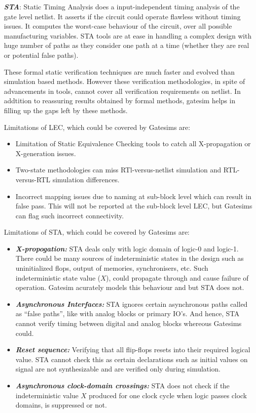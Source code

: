 \emph {\bf STA}: Static Timing Analysis does a input-independent timing analysis of the gate level netlist. It asserts if the circuit could operate flawless without timing issues. It computes the worst-case behaviour of the circuit, over all possible manufacturing variables. STA tools are at ease in handling a complex design with huge number of paths as they consider one path at a time (whether they are real or potential false paths). 



These formal static verification techniques are much faster and evolved than simulation based methods. However these verification methodologies, in spite of advancements in tools, cannot cover all verification requirements on netlist. In addtition to reassuring results obtained by formal methods, gatesim helps in filling up the gaps left by these methods. 

Limitations of LEC, which could be covered by Gatesims are:
\begin{itemize}
	\item Limitation of Static Equivalence Checking tools to catch all X-propagation or X-generation issues.
	\item Two-state methodologies can miss RTl-versus-netlist simulation and RTL-versus-RTL simulation differences.
	\item Incorrect mapping issues due to naming at sub-block level which can result in false pass. This will not be reported at the sub-block level LEC, but Gatesims can flag such incorrect connectivity.
\end{itemize}

Limitations of STA, which could be covered by Gatesims are:
\begin{itemize}
	\item \emph{\bf X-propogation:} STA deals only with logic domain of logic-0 and logic-1. There could be many sources of indeterministic states in the design such as uninitialized flops, output of memories, synchronisers, etc. Such indeterministic state value ($X$), could propagate through and cause failure of operation. Gatesim acurately models this behaviour and but STA does not.
	\item \emph{\bf Asynchronous Interfaces:} STA ignores certain asynchronous paths called as ``false paths'', like with analog blocks or primary IO's. And hence, STA cannot verify timing between digital and analog blocks whereous Gatesims could.
	\item \emph{\bf Reset sequence:} Verifying that all flip-flops resets into their required logical value. STA cannot check this as certain declarations such as initial values on signal are not synthesizable and are verified only during simulation.
	\item \emph{\bf Asynchronous clock-domain crossings:} STA does not check if the indeterministic value $X$ produced for one clock cycle when logic passes clock domains, is suppressed or not.
\end{itemize}








